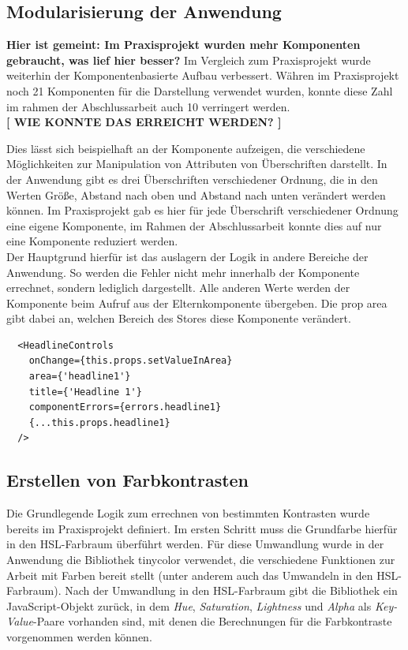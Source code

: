 \subsection{Modularisierung der Anwendung}
\textbf{Hier ist gemeint: Im Praxisprojekt wurden mehr Komponenten gebraucht, was lief hier besser?}
Im Vergleich zum Praxisprojekt wurde weiterhin der Komponentenbasierte Aufbau verbessert. Währen im Praxisprojekt noch 21 Komponenten für die Darstellung verwendet wurden, konnte diese Zahl im rahmen der Abschlussarbeit auch 10 verringert werden.\\
\textbf{[ WIE KONNTE DAS ERREICHT WERDEN? ]}

Dies lässt sich beispielhaft an der Komponente aufzeigen, die verschiedene Möglichkeiten zur Manipulation von Attributen von Überschriften darstellt. In der Anwendung gibt es drei Überschriften verschiedener Ordnung, die in den Werten Größe,  Abstand nach oben und Abstand  nach unten verändert werden können. Im Praxisprojekt gab es hier für jede Überschrift verschiedener Ordnung eine eigene Komponente, im Rahmen der Abschlussarbeit konnte dies auf nur eine Komponente reduziert werden.\\
Der Hauptgrund hierfür ist das auslagern der Logik in andere Bereiche der Anwendung. So werden die Fehler nicht mehr innerhalb der Komponente errechnet, sondern lediglich dargestellt. Alle anderen Werte werden der Komponente beim Aufruf aus der Elternkomponente übergeben. Die prop area gibt dabei an, welchen Bereich des Stores diese Komponente verändert.

\begin{lstlisting}
  <HeadlineControls
  	onChange={this.props.setValueInArea}
  	area={'headline1'}
  	title={'Headline 1'}
  	componentErrors={errors.headline1}
  	{...this.props.headline1}
  />
\end{lstlisting}

\subsection{Erstellen von Farbkontrasten}
Die Grundlegende Logik zum errechnen von bestimmten Kontrasten wurde bereits im Praxisprojekt definiert. Im ersten Schritt muss die Grundfarbe hierfür in den HSL-Farbraum überführt werden. Für diese Umwandlung wurde in der Anwendung die Bibliothek tinycolor\footnotemark{} verwendet, die verschiedene Funktionen zur Arbeit mit Farben bereit stellt (unter anderem auch das Umwandeln in den HSL-Farbraum).
Nach der Umwandlung in den HSL-Farbraum gibt die Bibliothek ein JavaScript-Objekt zurück, in dem \textit{Hue}, \textit{Saturation}, \textit{Lightness} und \textit{Alpha} als \textit{Key-Value}-Paare vorhanden sind, mit denen die Berechnungen für die Farbkontraste vorgenommen werden können.

